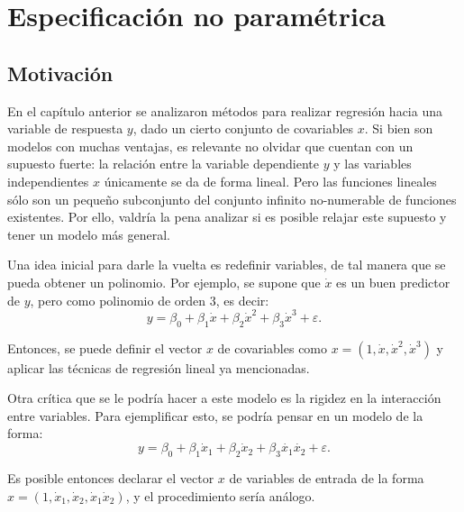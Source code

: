 \chapter[Especificaci\'on no param\'etrica]{Especificaci\'on no param\'etrica}

\section{Motivaci\'on}

En el cap\'itulo anterior se analizaron m\'etodos para realizar regresi\'on hacia una variable de respuesta $y$, dado un cierto conjunto de covariables $x$. Si bien son modelos con muchas ventajas, es relevante no olvidar que cuentan con un supuesto fuerte: la relación entre la variable dependiente $y$ y las variables independientes $x$ \'unicamente se da de forma lineal. Pero las funciones lineales s\'olo son un pequeño subconjunto del conjunto infinito no-numerable de funciones existentes. Por ello, valdr\'ia la pena analizar si es posible relajar este supuesto y tener un modelo m\'as general.

Una idea inicial para darle la vuelta es redefinir variables, de tal manera que se pueda obtener un polinomio. Por ejemplo, se supone que $\dot{x}$ es un buen predictor de $y$, pero como polinomio de orden 3, es decir:
\begin{equation*}
    y = \beta_0 + \beta_1\dot{x} + \beta_2\dot{x}^2 + \beta_3\dot{x}^3 + \varepsilon.
\end{equation*}

Entonces, se puede definir el vector $x$ de covariables como $x = (1,\dot{x},\dot{x}^2,\dot{x}^3)$ y aplicar las t\'ecnicas de regresi\'on lineal ya mencionadas.

Otra cr\'itica que se le podr\'ia hacer a este modelo es la rigidez en la interacci\'on entre variables. Para ejemplificar esto, se podr\'ia pensar en un modelo de la forma:
\begin{equation*}
    y = \beta_0 + \beta_1\dot{x}_1 + \beta_2\dot{x}_2 + \beta_3\dot{x_1}\dot{x_2} + \varepsilon.
\end{equation*}

Es posible entonces declarar el vector $x$ de variables de entrada de la forma $x = (1,\dot{x}_1,\dot{x}_2,\dot{x}_1\dot{x}_2)$, y el procedimiento ser\'ia an\'alogo.

